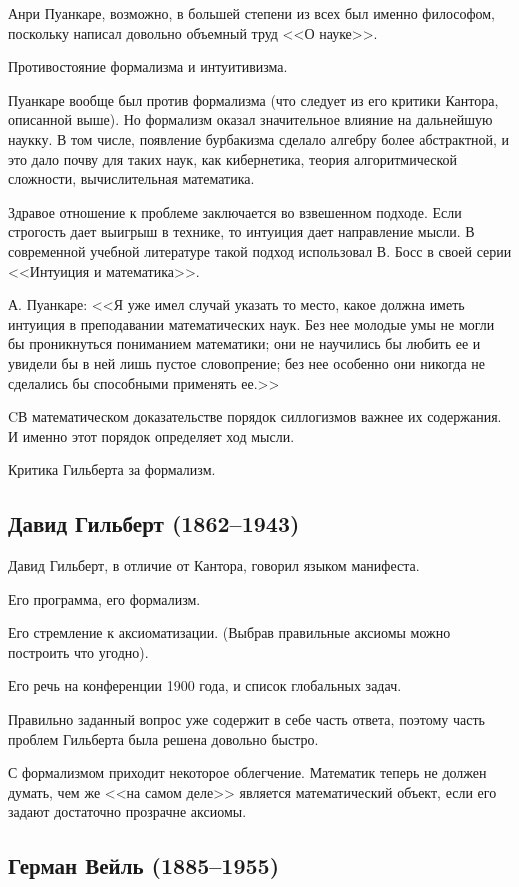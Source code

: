 \documentclass[a4paper,14pt]{article}
\begin{document}
Анри Пуанкаре, возможно, в большей степени из всех был именно философом, поскольку написал довольно объемный труд <<О науке>>.

Противостояние формализма и интуитивизма.

Пуанкаре вообще был против формализма (что следует из его критики Кантора, описанной выше). Но формализм оказал значительное влияние на дальнейшую наукку. В том числе, появление бурбакизма сделало алгебру более абстрактной, и это дало почву для таких наук, как кибернетика, теория алгоритмической сложности, вычислительная математика.

Здравое отношение к проблеме заключается во взвешенном подходе. Если строгость дает выигрыш в технике, то интуиция дает направление мысли. В современной учебной литературе такой подход использовал В. Босс в своей серии <<Интуиция и математика>>.

А. Пуанкаре: <<Я уже имел случай указать то место, какое должна иметь интуиция в преподавании математических наук. Без нее молодые умы не могли бы проникнуться пониманием математики; они не научились бы любить ее и увидели бы в ней лишь пустое словопрение; без нее особенно они никогда не сделались бы способными применять ее.>>\cite{onauke}

CВ математическом доказательстве порядок силлогизмов важнее их содержания. И именно этот порядок определяет ход мысли.

Критика Гильберта за формализм.

\subsection{Давид Гильберт (1862--1943)}

Давид Гильберт, в отличие от Кантора, говорил языком манифеста.

Его программа, его формализм.

Его стремление к аксиоматизации. (Выбрав правильные аксиомы можно построить что угодно).

Его речь на конференции 1900 года, и список глобальных задач.

Правильно заданный вопрос уже содержит в себе часть ответа, поэтому часть проблем Гильберта была решена довольно быстро.

С формализмом приходит некоторое облегчение. Математик теперь не должен думать, чем же <<на самом деле>> является математический объект, если его задают достаточно прозрачне аксиомы.


\subsection{Герман Вейль (1885--1955)}
\end{document}
